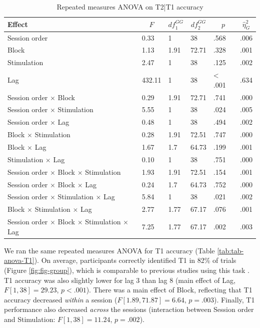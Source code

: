 \documentclass[11pt,]{memoir}
\begin{document}
\begin{table}[tbp]
\begin{center}
\begin{threeparttable}
\caption{\label{tab:tab-anova-T2}Repeated measures ANOVA on T2|T1 accuracy}
\small{
\begin{tabular}{llllll}
\toprule
Effect & \multicolumn{1}{c}{$F$} & \multicolumn{1}{c}{$\mathit{df}_1^{GG}$} & \multicolumn{1}{c}{$\mathit{df}_2^{GG}$} & \multicolumn{1}{c}{$p$} & \multicolumn{1}{c}{$\hat{\eta}^2_G$}\\
\midrule
Session order & 0.33 & 1 & 38 & .568 & .006\\
Block & 1.13 & 1.91 & 72.71 & .328 & .001\\
Stimulation & 2.47 & 1 & 38 & .125 & .002\\
Lag & 432.11 & 1 & 38 & < .001 & .634\\
Session order $\times$ Block & 0.29 & 1.91 & 72.71 & .741 & .000\\
Session order $\times$ Stimulation & 5.55 & 1 & 38 & .024 & .005\\
Session order $\times$ Lag & 0.48 & 1 & 38 & .494 & .002\\
Block $\times$ Stimulation & 0.28 & 1.91 & 72.51 & .747 & .000\\
Block $\times$ Lag & 1.67 & 1.7 & 64.73 & .199 & .001\\
Stimulation $\times$ Lag & 0.10 & 1 & 38 & .751 & .000\\
Session order $\times$ Block $\times$ Stimulation & 1.93 & 1.91 & 72.51 & .154 & .001\\
Session order $\times$ Block $\times$ Lag & 0.24 & 1.7 & 64.73 & .752 & .000\\
Session order $\times$ Stimulation $\times$ Lag & 5.84 & 1 & 38 & .021 & .002\\
Block $\times$ Stimulation $\times$ Lag & 2.77 & 1.77 & 67.17 & .076 & .001\\
Session order $\times$ Block $\times$ Stimulation $\times$ Lag & 7.25 & 1.77 & 67.17 & .002 & .003\\
\bottomrule
\end{tabular}
}
\end{threeparttable}
\end{center}
\end{table}

\normalsize

We ran the same repeated measures ANOVA for T1 accuracy (Table \ref{tab:tab-anova-T1}). On average, participants correctly identified T1 in 82\% of trials (Figure \ref{fig:fig-group}), which is comparable to previous studies using this task \autocites[86\% in][]{London2015}[in 82\% in][]{Slagter2013}. T1 accuracy was also slightly lower for lag 3 than lag 8 (main effect of Lag, \(F[1, 38] = 29.23\), \(p < .001\)). There was a main effect of Block, reflecting that T1 accuracy decreased \emph{within} a session (\(F[1.89, 71.87] = 6.64\), \(p = .003\)). Finally, T1 performance also decreased \emph{across} the sessions (interaction between Session order and Stimulation: \(F[1, 38] = 11.24\), \(p = .002\)).
\end{document}
